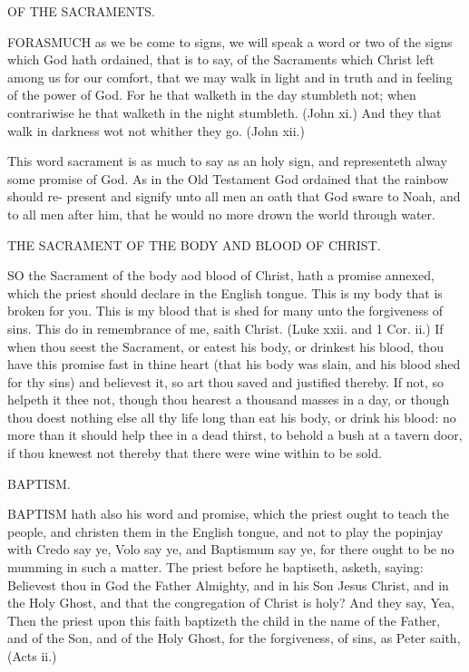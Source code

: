 \documentclass{custom}
\begin{document}
OF THE SACRAMENTS. 

FORASMUCH as we be come to signs, we will speak 
a word or two of the signs which God hath ordained, 
that is to say, of the Sacraments which Christ left among 
us for our comfort, that we may walk in light and in truth 
and in feeling of the power of God. For he that walketh 
in the day stumbleth not; when contrariwise he that 
walketh in the night stumbleth. (John xi.) And they that 
walk in darkness wot not whither they go. (John xii.) 

This word sacrament is as much to say as an holy sign, 
and representeth alway some promise of God. As in the 
Old Testament God ordained that the rainbow should re- 
present and signify unto all men an oath that God sware 
to Noah, and to all men after him, that he would no more 
drown the world through water. 


THE SACRAMENT OF THE BODY AND BLOOD 
OF CHRIST. 

SO the Sacrament of the body aod blood of Christ, hath 
a promise annexed, which the priest should declare in 
the English tongue. This is my body that is broken for 
you. This is my blood that is shed for many unto the 
forgiveness of sins. This do in remembrance of me, saith 
Christ. (Luke xxii. and 1 Cor. ii.) If when thou seest 
the Sacrament, or eatest his body, or drinkest his blood, 
thou have this promise fast in thine heart (that his body 
was slain, and his blood shed for thy sins) and believest it, 
so art thou saved and justified thereby. If not, so helpeth 
it thee not, though thou hearest a thousand masses in a 
day, or though thou doest nothing else all thy life long than 
eat his body, or drink his blood: no more than it should 
help thee in a dead thirst, to behold a bush at a tavern 
door, if thou knewest not thereby that there were wine 
within to be sold. 


BAPTISM. 

BAPTISM hath also his word and promise, which the 
priest ought to teach the people, and christen them in 
the English tongue, and not to play the popinjay with 
Credo say ye, Volo say ye, and Baptismum say ye, 
for there ought to be no mumming in such a matter. The 
priest before he baptiseth, asketh, saying: Believest thou 
in God the Father Almighty, and in his Son Jesus Christ, 
and in the Holy Ghost, and that the congregation of 
Christ is holy? And they say, Yea, Then the priest 
upon this faith baptizeth the child in the name of the 
Father, and of the Son, and of the Holy Ghost, for the 
forgiveness, of sins, as Peter saith, (Acts ii.) 
\end{document}
